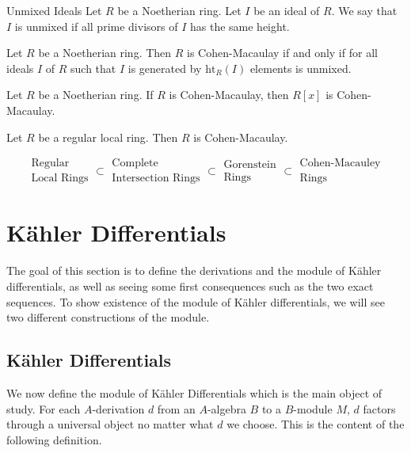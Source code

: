 \documentclass[a4paper]{article}
\begin{document}
\begin{defn}{Unmixed Ideals}{} Let $R$ be a Noetherian ring. Let $I$ be an ideal of $R$. We say that $I$ is unmixed if all prime divisors of $I$ has the same height. 
\end{defn}

\begin{prp}{}{} Let $R$ be a Noetherian ring. Then $R$ is Cohen-Macaulay if and only if for all ideals $I$ of $R$ such that $I$ is generated by $\text{ht}_R(I)$ elements is unmixed. 
\end{prp}

\begin{prp}{}{} Let $R$ be a Noetherian ring. If $R$ is Cohen-Macaulay, then $R[x]$ is Cohen-Macaulay. 
\end{prp}

\begin{prp}{}{} Let $R$ be a regular local ring. Then $R$ is Cohen-Macaulay. 
\end{prp}



$$\substack{\text{Regular}\\\text{Local Rings}}\subset\substack{\text{Complete}\\\text{Intersection Rings}}\subset\substack{\text{Gorenstein}\\\text{Rings}}\subset\substack{\text{Cohen-Macauley}\\\text{Rings}}$$

\pagebreak
\section{Kähler Differentials}
The goal of this section is to define the derivations and the module of Kähler differentials, as well as seeing some first consequences such as the two exact sequences. To show existence of the module of Kähler differentials, we will see two different constructions of the module. 

\subsection{Kähler Differentials}
We now define the module of Kähler Differentials which is the main object of study. For each $A$-derivation $d$ from an $A$-algebra $B$ to a $B$-module $M$, $d$ factors through a universal object no matter what $d$ we choose. This is the content of the following definition. 
\end{document}
